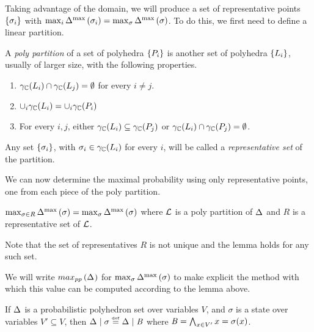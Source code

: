 Taking advantage of the domain, we will produce a set of
representative points $ \left\{ \sigma_i \right\} $ with
$ \max_{i}\Delta_{}^{\text{max}}\left( \sigma_i \right)
= \max_{\sigma}\Delta_{}^{\text{max}}\left( \sigma \right) $. To do this, we first need
to define a linear partition.

\begin{definition} \label{def:ppp:pp} A \emph{poly partition} of a set of polyhedra
$ \left\{ P_i \right\} $ is another set of polyhedra $ \left\{ L_i \right\} $, usually of
larger size, with the following properties.

\begin{enumerate}
\item{} $ \gamma_{\mathbb{C}}(L_i) \cap \gamma_{\mathbb{C}}(L_j) = \emptyset $
for every $ i \neq j $.
\item{} $ \cup_{i} \gamma_{\mathbb{C}}(L_i) = \cup_{i} \gamma_{\mathbb{C}}(P_i) $
\item{} For every $ i,j $, either $ \gamma_{\mathbb{C}}(L_i) \subseteq \gamma_{\mathbb{C}}(P_j)
$ or $ \gamma_{\mathbb{C}}(L_i) \cap \gamma_{\mathbb{C}}(P_j) = \emptyset $.
\end{enumerate}

Any set $ \left\{ \sigma_i \right\} $, with $ \sigma_i \in \gamma_{\mathbb{C}}(L_i) $ for every
$ i $, will be called a \emph{representative set} of the partition.
\end{definition}

We can now determine the maximal probability using only representative
points, one from each piece of the poly partition.

\begin{lemma} \label{lem:ppp:pp} $ \max_{\sigma \in R}\Delta_{}^{\text{max}}\left( \sigma \right)
= \max_{\sigma}\Delta_{}^{\text{max}}\left( \sigma \right) $ where $ \mathcal{L} $ is a poly
partition of $ \Delta_{} $ and $ R $ is a representative set
of $ \mathcal{L} $. 
\end{lemma}

Note that the set of representatives $ R $ is not unique
and the lemma holds for any such set.

We will write $ max_{pp}\left( \Delta_{} \right) $ for
$ \max_{\sigma}\Delta_{}^{\text{max}}\left( \sigma \right) $ to make explicit the method
with which this value can be computed according to the lemma above.


\begin{notation} If $ \Delta_{} $ is a probabilistic polyhedron set over
  variables $ V $, and $ \sigma $ is a state over variables $ V'
  \subseteq V $, then $ \Delta_{} \mid \sigma \stackrel{\smash{\scriptscriptstyle \mathrm{def}}}=
  \Delta_{} \mid \mathit{B} $ where $ \mathit{B} = \bigwedge_{x \in V'} x =
  \sigma(x) $.
\end{notation}

